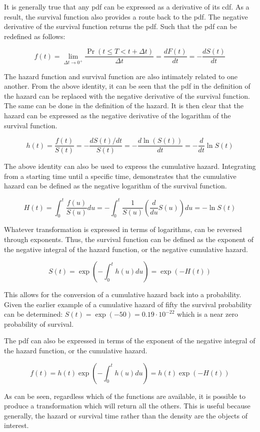 It is generally true that any pdf can be expressed as a derivative of its cdf. As a result, the survival function also provides a route back to the pdf. The negative derivative of the survival function returns the pdf. Such that the pdf can be redefined as follows:

$$ f(t) = \lim_{\Delta t \rightarrow 0^+} \frac{\Pr(t \le T < t + \Delta t) }{\Delta t} = \frac{d F(t)}{dt} = - \frac{d S(t)}{dt}$$

The hazard function and survival function are also intimately related to one another. From the above identity, it can be seen that the pdf in the definition of the hazard can be replaced with the negative derivative of the survival function. The same can be done in the definition of the hazard. It is then clear that the hazard can be expressed as the negative derivative of the logarithm of the survival function.

$$ h(t) = \frac{f(t)}{S(t)} = - \frac{d S(t) / dt }{S(t)} = - \frac{d \ln \left( S(t) \right) }{dt} = - \frac{d}{dt} \ln S(t)$$

The above identity can also be used to express the cumulative hazard. Integrating from a starting time until a specific time, demonstrates that the cumulative hazard can be defined as the negative logarithm of the survival function.

$$ H(t) = \int^t_0 \frac{f(u)}{S(u)}du = - \int^t_0 \frac{1}{S(u)} \left( \frac{d}{du} S(u)\right) du = -\ln S(t) $$

Whatever transformation is expressed in terms of logarithms, can be reversed through exponents. Thus, the survival function can be defined as the exponent of the negative integral of the hazard function, or the negative cumulative hazard.

$$ S(t) = \exp \left (- \int_0^t h(u) du  \right ) = \exp(-H(t)) $$

This allows for the conversion of a cumulative hazard back into a probability. Given the earlier example of a cumulative hazard of fifty the survival probability can be determined: $S(t) = \exp(-50) = 0.19 \cdot 10^{-22}$ which is a near zero probability of survival.

The pdf can also be expressed in terms of the exponent of the negative integral of the hazard function, or the cumulative hazard.

$$ f(t) = h(t) \exp \left (- \int_0^t h(u) du  \right ) = h(t) \exp(-H(t)) $$

As can be seen, regardless which of the functions are available, it is possible to produce a transformation which will return all the others. This is useful because generally, the hazard or survival time rather than the density are the objects of interest.

